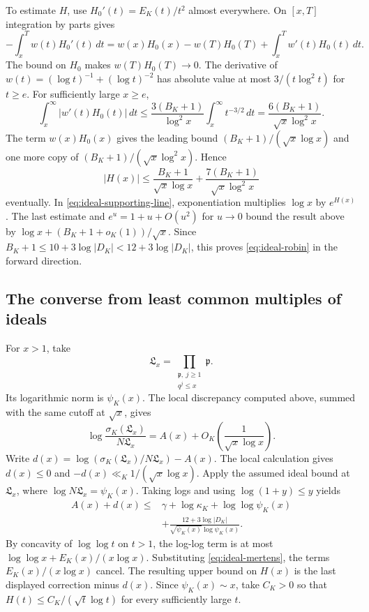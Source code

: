 \documentclass[11pt]{amsart}
\theoremstyle{definition}
\theoremstyle{remark}
\numberwithin{equation}{section}
\begin{document}
To estimate \(H\), use \(H_0'(t)=E_K(t)/t^2\) almost everywhere.
On \([x,T]\) integration by parts gives
\[
 -\int_x^T w(t)H_0'(t)\,dt
   =w(x)H_0(x)-w(T)H_0(T)+\int_x^T w'(t)H_0(t)\,dt.
\]
The bound on \(H_0\) makes \(w(T)H_0(T)\to0\).
The derivative of \(w(t)=(\log t)^{-1}+(\log t)^{-2}\)
has absolute value at most \(3/(t\log^2 t)\) for \(t\geq e\).
For sufficiently large \(x\geq e\),
\[
 \int_x^\infty |w'(t)H_0(t)|\,dt
 \leq\frac{3(B_K+1)}{\log^2 x}\int_x^\infty t^{-3/2}\,dt
 =\frac{6(B_K+1)}{\sqrt{x}\log^2 x}.
\]
The term \(w(x)H_0(x)\) gives the leading bound
\((B_K+1)/(\sqrt{x}\log x)\) and one more copy of
\((B_K+1)/(\sqrt{x}\log^2 x)\). Hence
\[
 |H(x)|\leq\frac{B_K+1}{\sqrt{x}\log x}
          +\frac{7(B_K+1)}{\sqrt{x}\log^2 x}
\]
eventually. In \eqref{eq:ideal-supporting-line}, exponentiation
multiplies \(\log x\) by \(e^{H(x)}\). The last estimate and
\(e^u=1+u+O(u^2)\) for \(u\to0\) bound the result above by
\(\log x+(B_K+1+o_K(1))/\sqrt{x}\).
Since \(B_K+1\leq10+3\log|D_K|<12+3\log|D_K|\),
this proves \eqref{eq:ideal-robin} in the forward direction.

\subsection{The converse from least common multiples of ideals}

For \(x>1\), take
\[
 \mathfrak L_x=\prod_{\substack{\mathfrak p,\ j\geq1\\q^j\leq x}}\mathfrak p .
\]
Its logarithmic norm is \(\psi_K(x)\). The local discrepancy
computed above, summed with the same cutoff at \(\sqrt{x}\), gives
\[
 \log\frac{\sigma_K(\mathfrak L_x)}{N\mathfrak L_x}
        =A(x)+O_K\!\left(\frac{1}{\sqrt{x}\log x}\right).
\]
Write \(d(x)=\log(\sigma_K(\mathfrak L_x)/N\mathfrak L_x)-A(x)\).
The local calculation gives \(d(x)\leq0\) and
\(-d(x)\ll_K 1/(\sqrt{x}\log x)\). Apply the assumed ideal bound
at \(\mathfrak L_x\), where \(\log N\mathfrak L_x=\psi_K(x)\).
Taking logs and using \(\log(1+y)\leq y\) yields
\begin{align*}
 A(x)+d(x)\leq {}&\gamma+\log\kappa_K+\log\log\psi_K(x)\\
 &+\frac{12+3\log|D_K|}{\sqrt{\psi_K(x)}\log\psi_K(x)}.
\end{align*}
By concavity of \(\log\log t\) on \(t>1\), the log-log term is
at most \(\log\log x+E_K(x)/(x\log x)\). Substituting
\eqref{eq:ideal-mertens}, the terms \(E_K(x)/(x\log x)\) cancel.
The resulting upper bound on \(H(x)\) is the last displayed
correction minus \(d(x)\). Since \(\psi_K(x)\sim x\), take \(C_K>0\)
so that \(H(t)\leq C_K/(\sqrt t\log t)\) for every sufficiently
large \(t\).
\end{document}
